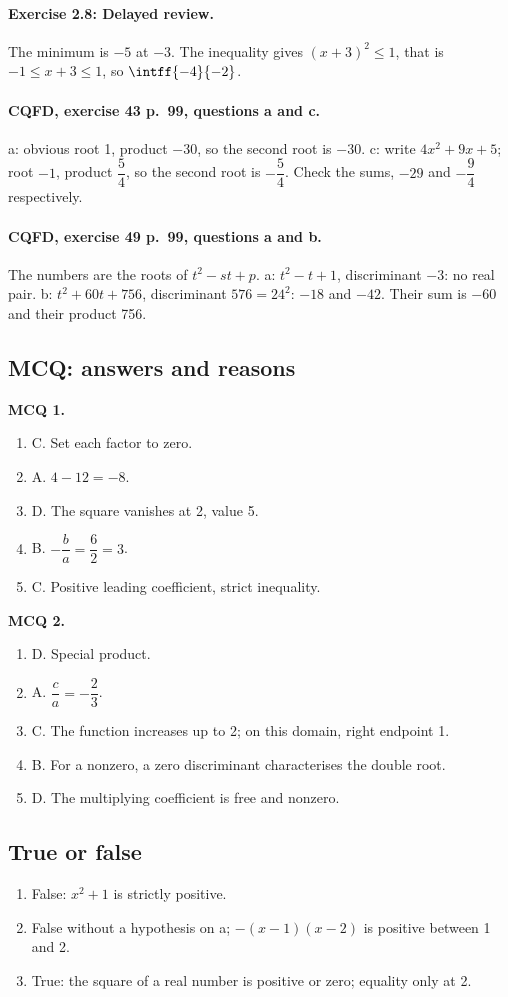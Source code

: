\paragraph{Exercise 2.8: Delayed review.} The minimum is $-5$ at $-3$. The inequality gives $(x+3)^2\leq1$, that is $-1\leq x+3\leq1$, so $\intff{-4}{-2}$.
\paragraph{CQFD, exercise 43 p.~99, questions a and c.} a: obvious root 1, product $-30$, so the second root is $-30$. c: write $4x^2+9x+5$; root $-1$, product $\dfrac54$, so the second root is $-\dfrac54$. Check the sums, $-29$ and $-\dfrac94$ respectively.
\paragraph{CQFD, exercise 49 p.~99, questions a and b.} The numbers are the roots of $t^2-st+p$. a: $t^2-t+1$, discriminant $-3$: no real pair. b: $t^2+60t+756$, discriminant $576=24^2$: $-18$ and $-42$. Their sum is $-60$ and their product 756.
\subsection*{MCQ: answers and reasons}
\textbf{MCQ 1.}
\begin{enumerate}
\item C. Set each factor to zero.
\item A. $4-12=-8$.
\item D. The square vanishes at 2, value 5.
\item B. $-\dfrac{b}{a}=\dfrac{6}{2}=3$.
\item C. Positive leading coefficient, strict inequality.
\end{enumerate}
\textbf{MCQ 2.}
\begin{enumerate}
\item D. Special product.
\item A. $\dfrac{c}{a}=-\dfrac{2}{3}$.
\item C. The function increases up to 2; on this domain, right endpoint 1.
\item B. For a nonzero, a zero discriminant characterises the double root.
\item D. The multiplying coefficient is free and nonzero.
\end{enumerate}
\subsection*{True or false}
\begin{enumerate}
\item False: $x^2+1$ is strictly positive.
\item False without a hypothesis on a; $-(x-1)(x-2)$ is positive between 1 and 2.
\item True: the square of a real number is positive or zero; equality only at 2.
\end{enumerate}
